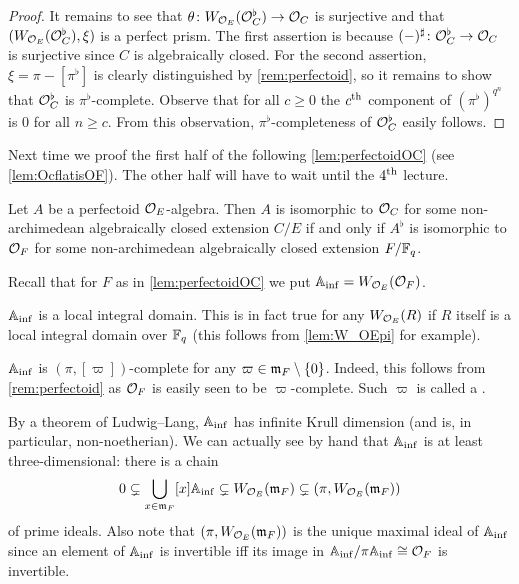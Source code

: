 \begin{proof}
	It remains to see that $\theta\colon W_{\Oo_E}(\Oo_C^\flat)\morphism\Oo_C$ is surjective and that $(W_{\mathcal{O}_E}(\mathcal{O}_C^\flat),\xi)$ is a perfect prism. The first assertion is because $(-)^\sharp\colon \Oo_C^\flat\morphism\Oo_C$ is surjective since $C$ is algebraically closed. For the second assertion, $\xi=\pi-[\pi^\flat]$ is clearly distinguished by \cref{rem:perfectoid}, so it remains to show that $\mathcal{O}_C^\flat$ is $\pi^\flat$-complete. Observe that for all $c\geq 0$ the $c^{\text{th}}$ component of $(\pi^\flat)^{q^n}$ is $0$ for all $n\geq c$. From this observation, $\pi^\flat$-completeness of $\mathcal{O}_C^\flat$ easily follows.
\end{proof}
Next time we proof the first half of the following \cref{lem:perfectoidOC} (see \cref{lem:OcflatisOF}). The other half will have to wait until the $4^{\text{th}}$ lecture.
\begin{lem}\label{lem:perfectoidOC}
	Let $A$ be a perfectoid $\mathcal{O}_E$-algebra. Then $A$ is isomorphic to $\mathcal{O}_C$ for some non-archimedean algebraically closed extension $C/E$ if and only if $A^\flat$ is isomorphic to $\mathcal{O}_F$ for some non-archimedean algebraically closed extension $F/\mathbb{F}_q$.
\end{lem}
\begin{rem}\label{rem:AinfProperties}
	Recall that for $F$ as in \cref{lem:perfectoidOC} we put $\mathbb{A}_{\mathrm{inf}}=W_{\mathcal{O}_E}(\mathcal{O}_F)$.
	\begin{numerate}
		\item $\mathbb{A}_{\mathrm{inf}}$ is a local integral domain. This is in fact true for any $W_{\mathcal{O}_E}(R)$ if $R$ itself is a local integral domain over $\mathbb{F}_q$ (this follows from \cref{lem:W_OEpi} for example).
		\item $\mathbb{A}_{\mathrm{inf}}$ is $(\pi,[\varpi])$-complete for any $\varpi\in\mathfrak{m}_F\setminus \{0\}$. Indeed, this follows from \cref{rem:perfectoid} as $\mathcal{O}_F$ is easily seen to be $\varpi$-complete. Such $\varpi$ is called a .
		\item By a theorem of Ludwig--Lang, $\mathbb{A}_{\mathrm{inf}}$ has infinite Krull dimension (and is, in particular, non-noetherian). We can actually see by hand that $\mathbb{A}_{\mathrm{inf}}$ is at least three-dimensional: there is a chain
		\begin{equation*}
			0\subsetneq\bigcup_{x\in\mathfrak{m}_F}[x]\mathbb{A}_{\mathrm{inf}}\subsetneq W_{\mathcal{O}_E}(\mathfrak{m}_F)\subsetneq (\pi,W_{\mathcal{O}_E}(\mathfrak{m}_F))
		\end{equation*}
		of prime ideals. Also note that $(\pi,W_{\mathcal{O}_E}(\mathfrak{m}_F))$ is the unique maximal ideal of $\mathbb{A}_{\mathrm{inf}}$ since an element of $\mathbb{A}_{\mathrm{inf}}$ is invertible iff its image in $\mathbb{A}_{\mathrm{inf}}/\pi\mathbb{A}_{\mathrm{inf}}\cong \mathcal{O}_F$ is invertible.
	\end{numerate}
\end{rem}
